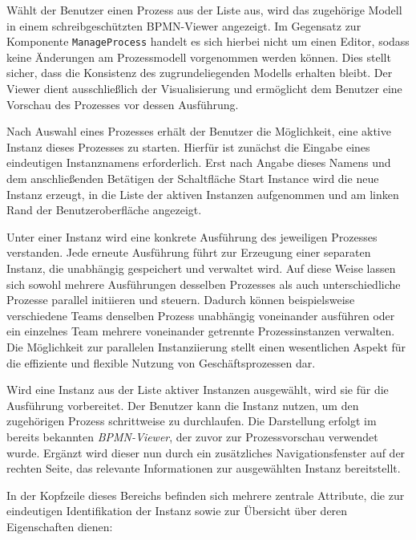 
Wählt der Benutzer einen Prozess aus der Liste aus, wird das zugehörige Modell in einem schreibgeschützten BPMN-Viewer angezeigt. Im Gegensatz zur Komponente \texttt{ManageProcess} handelt es sich hierbei nicht um einen Editor, sodass keine Änderungen am Prozessmodell vorgenommen werden können. Dies stellt sicher, dass die Konsistenz des zugrundeliegenden Modells erhalten bleibt. Der Viewer dient ausschließlich der Visualisierung und ermöglicht dem Benutzer eine Vorschau des Prozesses vor dessen Ausführung.

\newpage
{}

Nach Auswahl eines Prozesses erhält der Benutzer die Möglichkeit, eine aktive Instanz dieses Prozesses zu starten. Hierfür ist zunächst die Eingabe eines eindeutigen Instanznamens erforderlich. Erst nach Angabe dieses Namens und dem anschließenden Betätigen der Schaltfläche Start Instance wird die neue Instanz erzeugt, in die Liste der aktiven Instanzen aufgenommen und am linken Rand der Benutzeroberfläche angezeigt.

Unter einer Instanz wird eine konkrete Ausführung des jeweiligen Prozesses verstanden. Jede erneute Ausführung führt zur Erzeugung einer separaten Instanz, die unabhängig gespeichert und verwaltet wird. Auf diese Weise lassen sich sowohl mehrere Ausführungen desselben Prozesses als auch unterschiedliche Prozesse parallel initiieren und steuern. Dadurch können beispielsweise verschiedene Teams denselben Prozess unabhängig voneinander ausführen oder ein einzelnes Team mehrere voneinander getrennte Prozessinstanzen verwalten. Die Möglichkeit zur parallelen Instanziierung stellt einen wesentlichen Aspekt für die effiziente und flexible Nutzung von Geschäftsprozessen dar.


Wird eine Instanz aus der Liste aktiver Instanzen ausgewählt, wird sie für die Ausführung vorbereitet. Der Benutzer kann die Instanz nutzen, um den zugehörigen Prozess schrittweise zu durchlaufen. Die Darstellung erfolgt im bereits bekannten \textit{BPMN-Viewer}, der zuvor zur Prozessvorschau verwendet wurde. Ergänzt wird dieser nun durch ein zusätzliches Navigationsfenster auf der rechten Seite, das relevante Informationen zur ausgewählten Instanz bereitstellt.

In der Kopfzeile dieses Bereichs befinden sich mehrere zentrale Attribute, die zur eindeutigen Identifikation der Instanz sowie zur Übersicht über deren Eigenschaften dienen:

